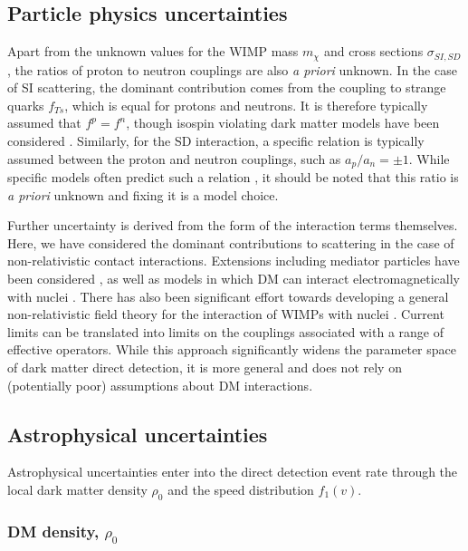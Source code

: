\subsection{Particle physics uncertainties}
\label{sec:DD:particleunc}
Apart from the unknown values for the WIMP mass $m_\chi$ and cross sections $\sigma_{SI,SD}$, the ratios of proton to neutron couplings are also \textit{a priori} unknown. In the case of SI scattering, the dominant contribution comes from the coupling to strange quarks $f_{Ts}$, which is equal for protons and neutrons. It is therefore typically assumed that $f^p = f^n$, though isospin violating dark matter models have been considered \cite{Feng:2011, Kumar:2012,Hamaguchi:2014}. Similarly, for the SD interaction, a specific relation is typically assumed between the proton and neutron couplings, such as $a_p/a_n = \pm1$. While specific models often predict such a relation \cite{Jungman:1995}, it should be noted that this ratio is \textit{a priori} unknown and fixing it is a model choice.

Further uncertainty is derived from the form of the interaction terms themselves. Here, we have considered the dominant contributions to scattering in the case of non-relativistic contact interactions. Extensions including mediator particles have been considered \cite{Schmidt-Hoberg:2013, An:2014}, as well as models in which DM can interact electromagnetically with nuclei \cite{Pospelov:2000, Ho:2013}. There has also been significant effort towards developing a general non-relativistic field theory for the interaction of WIMPs with nuclei \cite{Kurylov:2003,Fan:2010,Cirelli:2013,Fitzpatrick:2013}. Current limits can be translated into limits on the couplings associated with a range of effective operators. While this approach significantly widens the parameter space of dark matter direct detection, it is more general and does not rely on (potentially poor) assumptions about DM interactions.


\subsection{Astrophysical uncertainties}
\label{sec:DD:astrounc}

Astrophysical uncertainties enter into the direct detection event rate through the local dark matter density $\rho_0$ and the speed distribution $f_1(v)$.

\subsubsection{DM density, $\rho_0$}

